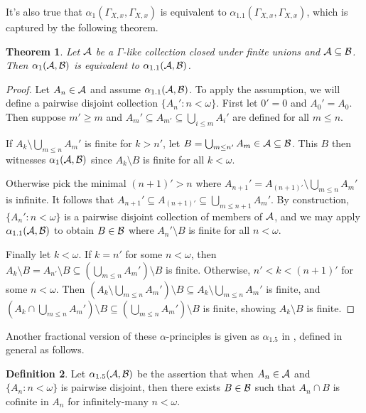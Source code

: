 \documentclass{amsart}
\theoremstyle{plain}
\newtheorem{theorem}{Theorem}
\theoremstyle{definition}
\newtheorem{definition}[theorem]{Definition}
\theoremstyle{remark}
\theoremstyle{plain}
\theoremstyle{definition}
\theoremstyle{remark}
\begin{document}
It's also true that \(\alpha_1(\Gamma_{X,x},\Gamma_{X,x})\)
is equivalent to \(\alpha_{1.1}(\Gamma_{X,x},\Gamma_{X,x})\),
which is captured by the following theorem.

\begin{theorem}
Let \(\mathcal{A}\) be a \(\Gamma\)-like collection closed under finite unions
and \(\mathcal{A}\subseteq\mathcal{B}\).
Then \(\alpha_1(\mathcal{A},\mathcal{B})\) is equivalent to
\(\alpha_{1.1}(\mathcal{A},\mathcal{B})\).
\end{theorem}
 
\begin{proof}
Let \(A_n\in\mathcal{A}\) and assume \(\alpha_{1.1}(\mathcal{A},\mathcal{B})\).
To apply the assumption, we will define a pairwise disjoint
collection \(\{A_n':n<\omega\}\). First let \(0'=0\) and \(A_0'=A_0\).
Then suppose \(m'\geq m\) and \(A_m'\subseteq A_{m'}\subseteq\bigcup_{i\leq m}A_i'\) 
are defined for all \(m\leq n\).

If \(A_k\setminus\bigcup_{m\leq n}A_m'\) is finite for \(k>n'\), let
\(B=\bigcup_{m\leq n'}A_m\in\mathcal{A}\subseteq\mathcal{B}\). This \(B\) then witnesses 
\(\alpha_1(\mathcal{A},\mathcal{B})\) since \(A_k\setminus B\) is finite for all \(k<\omega\).

Otherwise pick the minimal \((n+1)'>n\) where 
\(A_{n+1}'=A_{(n+1)'}\setminus\bigcup_{m\leq n}A_m'\) is infinite.
It follows that \(A_{n+1}'\subseteq A_{(n+1)'}\subseteq \bigcup_{m\leq n+1}A_m'\).
By construction, \(\{A_n':n<\omega\}\) is a pairwise disjoint collection of
members of \(\mathcal{A}\), and we may
apply \(\alpha_{1.1}(\mathcal{A},\mathcal{B})\) to obtain \(B\in\mathcal{B}\) where
\(A_n'\setminus B\) is finite for all \(n<\omega\).

Finally let \(k<\omega\). If \(k=n'\) for some \(n<\omega\), then 
\(A_k\setminus B=A_{n'}\setminus B\subseteq (\bigcup_{m\leq n}A_m')\setminus B\) 
is finite.
Otherwise, \(n'<k<(n+1)'\) for some \(n<\omega\).
Then 
\((A_k\setminus\bigcup_{m\leq n}A_m')\setminus B\subseteq A_k\setminus\bigcup_{m\leq n}A_m'\)
is finite, and 
\((A_k\cap\bigcup_{m\leq n}A_m')\setminus B\subseteq(\bigcup_{m\leq n}A_m')\setminus B\)
is finite, showing \(A_k\setminus B\) is finite.
\end{proof}

Another fractional version of these \(\alpha\)-principles is given as
\(\alpha_{1.5}\) in \cite{MR1195504}, defined in general as follows.

\begin{definition}
Let \(\alpha_{1.5}(\mathcal{A},\mathcal{B})\) be the assertion that when \(A_n\in\mathcal{A}\)
and \(\{A_n:n<\omega\}\) is pairwise disjoint, then there exists \(B\in\mathcal{B}\)
such that \(A_n\cap B\) is cofinite in \(A_n\) for infinitely-many \(n<\omega\).
\end{definition}
\end{document}
